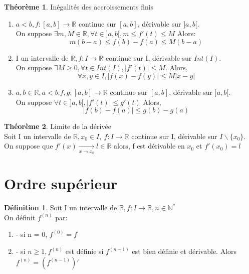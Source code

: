 \documentclass[fleqn]{article}
\theoremstyle{definition} \newtheorem*{defi}{D\'efinition}
\theoremstyle{definition} \newtheorem*{theo}{Th\'eor\`eme}
\theoremstyle{remark} \newtheorem*{rqs}{Remarques}
\theoremstyle{definition} \newtheorem*{prop}{Propri\'et\'e}
\begin{document}
\begin{theo} In\'egalit\'es des accroissements finis
	\begin{enumerate}
		\item $a<b, f:[a,b] \rightarrow \mathbb{R}$ continue sur $[a,b]$, d\'erivable sur $]a,b[$.\\
			On suppose $\exists m,M \in \mathbb{R}, \forall t \in ]a,b[, m \leq f'(t) \leq M$ Alors:
			\[m(b-a) \leq f(b) - f(a) \leq M(b-a)\]
		\item I un intervalle de $\mathbb{R}, f:I \rightarrow \mathbb{R}$ continue sur I, d\'erivable sur $Int(I)$.\\
			On suppose $\exists M\geq 0, \forall t \in Int(I), |f'(t)| \leq M$. Alors,
			\[\forall x,y \in I, |f(x) - f(y)| \leq M|x-y|\]
		\item $a,b \in \mathbb{R}, a<b. f,g:[a,b] \rightarrow \mathbb{R}$ continue sur $[a,b]$, d\'erivable sur $]a,b[$.\\
			On suppose $\forall t \in ]a,b[, |f'(t)| \leq g'(t)$ Alors,
			\[|f(b) - f(a)| \leq g(b) - g(a)\]
	\end{enumerate}
\end{theo}

\begin{theo} Limite de la d\'eriv\'ee \\
	Soit I un intervalle de $\mathbb{R}, x_0 \in I,\ f:I\rightarrow \mathbb{R}$ continue sur I, d\'erivable sur $I\backslash\{x_0\}$.\\
	On suppose que $f'(x) \underset{x \rightarrow x_0}{\rightarrow} l \in \mathbb{R}$ alors, f est d\'erivable en $x_0$ et $f'(x_0) = l$
\end{theo}

\section{Ordre sup\'erieur}
\begin{defi}
	Soit I un intervalle de $\mathbb{R}, f:I \rightarrow \mathbb{R}, n \in \mathbb{N}^{*}$ \\
	On d\'efinit $f^{(n)}$ par:
	\begin{enumerate}
		\item - si n = 0, $f^{(0)} = f$
		\item - si $n \geq 1, f^{(n)}$ est d\'efinie si $f^{(n-1)}$ est bien d\'efinie et d\'erivable. Alors $f^{(n)} = (f^{(n-1)})'$
	\end{enumerate}
\end{defi}
\end{document}
